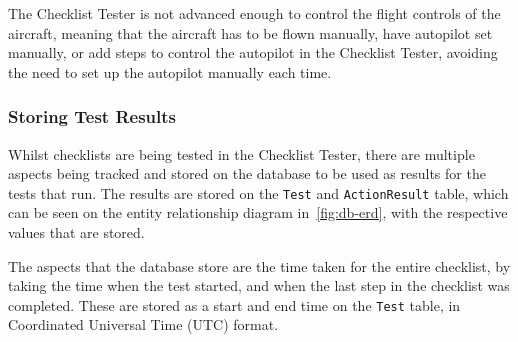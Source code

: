 \documentclass[../dissertation.tex]{subfiles}
\begin{document}
The Checklist Tester is not advanced enough to control the flight controls
of the aircraft, meaning that the aircraft has to be flown manually,
have autopilot set manually, or add steps to control the autopilot in the Checklist Tester,
avoiding the need to set up the autopilot manually each time.  

\subsubsection{Storing Test Results}

Whilst checklists are being tested in the Checklist Tester,
there are multiple aspects being tracked and stored on the database to be
used as results for the tests that run. The results are stored on the
\lstinline|Test| and \lstinline|ActionResult| table, which can be seen on the
entity relationship diagram in~\autoref{fig:db-erd}, with the respective values
that are stored.

The aspects that the database store are the time taken for the entire
checklist, by taking the time when the test started, and when the last step in the
checklist was completed. These are stored as a start and end time on the \lstinline|Test|
table, in Coordinated Universal Time (UTC) format.
\end{document}
